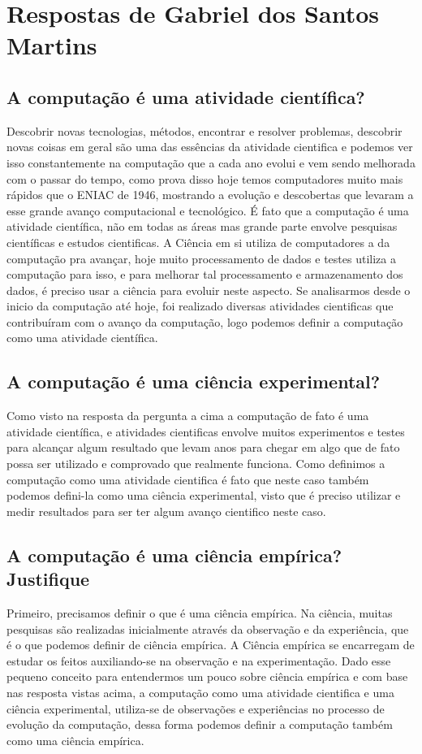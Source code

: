 \section{Respostas de Gabriel dos Santos Martins}

\subsection{A computação é uma atividade científica?}
Descobrir novas tecnologias, métodos, encontrar e resolver problemas, descobrir novas coisas em geral são uma das essências da atividade cientifica e podemos ver isso constantemente na computação que a cada ano evolui e vem sendo melhorada com o passar do tempo, como prova disso hoje temos computadores muito mais rápidos que o ENIAC de 1946, mostrando a evolução e descobertas que levaram a esse grande avanço computacional e tecnológico. É fato que a computação é uma atividade científica, não em todas as áreas mas grande parte envolve pesquisas científicas e estudos cientificas. A Ciência em si utiliza de computadores a da computação pra avançar, hoje muito processamento de dados e testes utiliza a computação para isso, e para melhorar tal processamento e armazenamento dos dados, é preciso usar a ciência para evoluir neste aspecto. 
Se analisarmos desde o inicio da computação até hoje, foi realizado diversas atividades cientificas que contribuíram com o avanço da computação, logo podemos definir a computação como uma atividade científica.

\subsection{A computação é uma ciência experimental?}
Como visto na resposta da pergunta a cima a computação de fato é uma atividade científica, e atividades cientificas envolve muitos experimentos e testes para alcançar algum resultado que levam anos para chegar em algo que de fato possa ser utilizado e comprovado que realmente funciona. Como definimos a computação como uma atividade cientifica é fato que neste caso também podemos defini-la como uma ciência experimental, visto que é preciso utilizar e medir resultados para ser ter algum avanço cientifico neste caso. 

\subsection{A computação é uma ciência empírica? Justifique}
Primeiro, precisamos definir o que é uma ciência empírica. Na ciência, muitas pesquisas são realizadas inicialmente através da observação e da experiência, que é o que podemos definir de ciência empírica. A 
Ciência empírica se encarregam de estudar os feitos auxiliando-se na observação e na experimentação. 
Dado esse pequeno conceito para entendermos um pouco sobre ciência empírica e com base nas resposta vistas acima, a computação como uma atividade cientifica e uma ciência experimental, utiliza-se de observações e experiências no processo de evolução da computação, dessa forma podemos definir a computação também como uma ciência empírica. 
